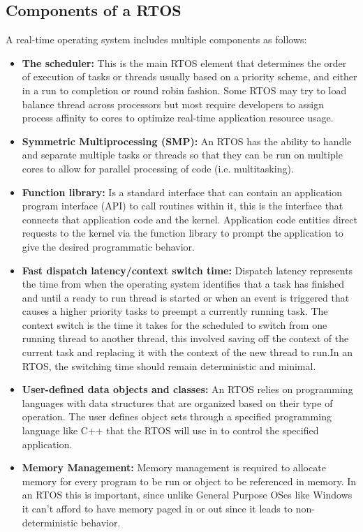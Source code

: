 \documentclass{FR16}
\begin{document}
\subsection{Components of a RTOS}
A real-time operating system includes multiple components as follows:
\begin{itemize}
    \item \textbf{The scheduler:} This is the main RTOS element that determines the order of execution of tasks or threads usually based on a priority scheme, and either in a run to completion or round robin fashion. Some RTOS may try to load balance thread across processors but most require developers to assign process affinity to cores to optimize real-time application resource usage.

\item \textbf{Symmetric Multiprocessing (SMP):} An RTOS has the ability to handle and separate multiple tasks or threads so that they can be run on multiple cores to allow for parallel processing of code (i.e. multitasking).

\item  \textbf{Function library:} Is a standard interface that can contain an application program interface (API) to call routines within it, this is the interface that connects that application code and the kernel. Application code entities direct requests to the kernel via the function library to prompt the application to give the desired programmatic behavior.

\item  \textbf{Fast dispatch latency/context switch time:} Dispatch latency represents the time from when the operating system identifies that a task has finished and until a ready to run thread is started or when an event is triggered that causes a higher priority tasks to preempt a currently running task. The context switch is the time it takes for the scheduled to switch from one running thread to another thread, this involved saving off the context of the current task and replacing it with the context of the new thread to run.In an RTOS, the switching time should remain deterministic and minimal.

\item  \textbf{User-defined data objects and classes:} An RTOS relies on programming languages with data structures that are organized based on their type of operation. The user defines object sets through a specified programming language like C++ that the RTOS will use in to control the specified application.

\item  \textbf{Memory Management:} Memory management is required to allocate memory for every program to be run or object to be referenced in memory. In an RTOS this is important, since unlike General Purpose OSes like Windows it can’t afford to have memory paged in or out since it leads to non-deterministic behavior.

\end{itemize}
\end{document}
